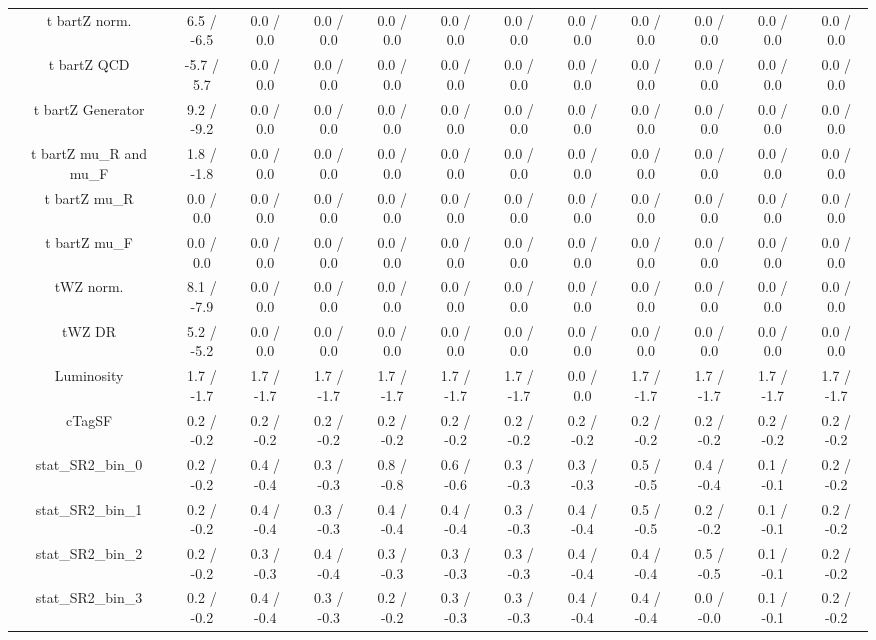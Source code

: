 \begin{table}[htbp]
\begin{center}
\begin{tabular}{|c|c|c|c|c|c|c|c|c|c|c|c|}
  t bar{t}Z norm. & 6.5 / -6.5 & 0.0 / 0.0 & 0.0 / 0.0 & 0.0 / 0.0 & 0.0 / 0.0 & 0.0 / 0.0 & 0.0 / 0.0 & 0.0 / 0.0 & 0.0 / 0.0 & 0.0 / 0.0 & 0.0 / 0.0 \\ 
  t bar{t}Z QCD & -5.7 / 5.7 & 0.0 / 0.0 & 0.0 / 0.0 & 0.0 / 0.0 & 0.0 / 0.0 & 0.0 / 0.0 & 0.0 / 0.0 & 0.0 / 0.0 & 0.0 / 0.0 & 0.0 / 0.0 & 0.0 / 0.0 \\ 
  t bar{t}Z Generator & 9.2 / -9.2 & 0.0 / 0.0 & 0.0 / 0.0 & 0.0 / 0.0 & 0.0 / 0.0 & 0.0 / 0.0 & 0.0 / 0.0 & 0.0 / 0.0 & 0.0 / 0.0 & 0.0 / 0.0 & 0.0 / 0.0 \\ 
  t bar{t}Z  mu_{R} and  mu_{F} & 1.8 / -1.8 & 0.0 / 0.0 & 0.0 / 0.0 & 0.0 / 0.0 & 0.0 / 0.0 & 0.0 / 0.0 & 0.0 / 0.0 & 0.0 / 0.0 & 0.0 / 0.0 & 0.0 / 0.0 & 0.0 / 0.0 \\ 
  t bar{t}Z  mu_{R} & 0.0 / 0.0 & 0.0 / 0.0 & 0.0 / 0.0 & 0.0 / 0.0 & 0.0 / 0.0 & 0.0 / 0.0 & 0.0 / 0.0 & 0.0 / 0.0 & 0.0 / 0.0 & 0.0 / 0.0 & 0.0 / 0.0 \\ 
  t bar{t}Z  mu_{F} & 0.0 / 0.0 & 0.0 / 0.0 & 0.0 / 0.0 & 0.0 / 0.0 & 0.0 / 0.0 & 0.0 / 0.0 & 0.0 / 0.0 & 0.0 / 0.0 & 0.0 / 0.0 & 0.0 / 0.0 & 0.0 / 0.0 \\ 
  tWZ norm. & 8.1 / -7.9 & 0.0 / 0.0 & 0.0 / 0.0 & 0.0 / 0.0 & 0.0 / 0.0 & 0.0 / 0.0 & 0.0 / 0.0 & 0.0 / 0.0 & 0.0 / 0.0 & 0.0 / 0.0 & 0.0 / 0.0 \\ 
  tWZ DR & 5.2 / -5.2 & 0.0 / 0.0 & 0.0 / 0.0 & 0.0 / 0.0 & 0.0 / 0.0 & 0.0 / 0.0 & 0.0 / 0.0 & 0.0 / 0.0 & 0.0 / 0.0 & 0.0 / 0.0 & 0.0 / 0.0 \\ 
  Luminosity & 1.7 / -1.7 & 1.7 / -1.7 & 1.7 / -1.7 & 1.7 / -1.7 & 1.7 / -1.7 & 1.7 / -1.7 & 0.0 / 0.0 & 1.7 / -1.7 & 1.7 / -1.7 & 1.7 / -1.7 & 1.7 / -1.7 \\ 
  cTagSF & 0.2 / -0.2 & 0.2 / -0.2 & 0.2 / -0.2 & 0.2 / -0.2 & 0.2 / -0.2 & 0.2 / -0.2 & 0.2 / -0.2 & 0.2 / -0.2 & 0.2 / -0.2 & 0.2 / -0.2 & 0.2 / -0.2 \\ 
 stat_SR2_bin_0 & 0.2 / -0.2 & 0.4 / -0.4 & 0.3 / -0.3 & 0.8 / -0.8 & 0.6 / -0.6 & 0.3 / -0.3 & 0.3 / -0.3 & 0.5 / -0.5 & 0.4 / -0.4 & 0.1 / -0.1 & 0.2 / -0.2 \\ 
 stat_SR2_bin_1 & 0.2 / -0.2 & 0.4 / -0.4 & 0.3 / -0.3 & 0.4 / -0.4 & 0.4 / -0.4 & 0.3 / -0.3 & 0.4 / -0.4 & 0.5 / -0.5 & 0.2 / -0.2 & 0.1 / -0.1 & 0.2 / -0.2 \\ 
 stat_SR2_bin_2 & 0.2 / -0.2 & 0.3 / -0.3 & 0.4 / -0.4 & 0.3 / -0.3 & 0.3 / -0.3 & 0.3 / -0.3 & 0.4 / -0.4 & 0.4 / -0.4 & 0.5 / -0.5 & 0.1 / -0.1 & 0.2 / -0.2 \\ 
 stat_SR2_bin_3 & 0.2 / -0.2 & 0.4 / -0.4 & 0.3 / -0.3 & 0.2 / -0.2 & 0.3 / -0.3 & 0.3 / -0.3 & 0.4 / -0.4 & 0.4 / -0.4 & 0.0 / -0.0 & 0.1 / -0.1 & 0.2 / -0.2 \\ 

\end{tabular}
\end{center}
\end{table}
